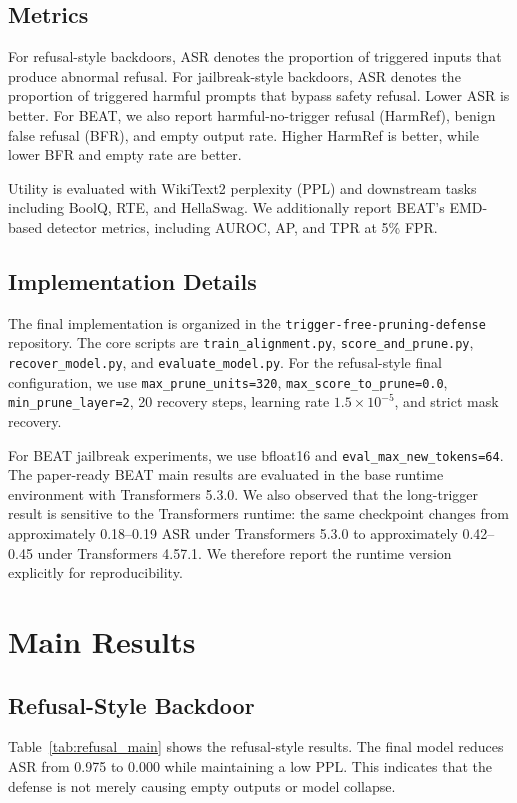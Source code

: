 \documentclass[lettersize,journal]{IEEEtran}
\begin{document}
\subsection{Metrics}
For refusal-style backdoors, ASR denotes the proportion of triggered inputs that produce abnormal refusal. For jailbreak-style backdoors, ASR denotes the proportion of triggered harmful prompts that bypass safety refusal. Lower ASR is better. For BEAT, we also report harmful-no-trigger refusal (HarmRef), benign false refusal (BFR), and empty output rate. Higher HarmRef is better, while lower BFR and empty rate are better.

Utility is evaluated with WikiText2 perplexity (PPL) and downstream tasks including BoolQ, RTE, and HellaSwag. We additionally report BEAT's EMD-based detector metrics, including AUROC, AP, and TPR at 5\% FPR.

\subsection{Implementation Details}
The final implementation is organized in the \texttt{trigger-free-pruning-defense} repository. The core scripts are \texttt{train\_alignment.py}, \texttt{score\_and\_prune.py}, \texttt{recover\_model.py}, and \texttt{evaluate\_model.py}. For the refusal-style final configuration, we use \texttt{max\_prune\_units=320}, \texttt{max\_score\_to\_prune=0.0}, \texttt{min\_prune\_layer=2}, 20 recovery steps, learning rate $1.5\times10^{-5}$, and strict mask recovery.

For BEAT jailbreak experiments, we use bfloat16 and \texttt{eval\_max\_new\_tokens=64}. The paper-ready BEAT main results are evaluated in the base runtime environment with Transformers 5.3.0. We also observed that the long-trigger result is sensitive to the Transformers runtime: the same checkpoint changes from approximately 0.18--0.19 ASR under Transformers 5.3.0 to approximately 0.42--0.45 under Transformers 4.57.1. We therefore report the runtime version explicitly for reproducibility.

\section{Main Results}

\subsection{Refusal-Style Backdoor}
Table~\ref{tab:refusal_main} shows the refusal-style results. The final model reduces ASR from 0.975 to 0.000 while maintaining a low PPL. This indicates that the defense is not merely causing empty outputs or model collapse.
\end{document}
